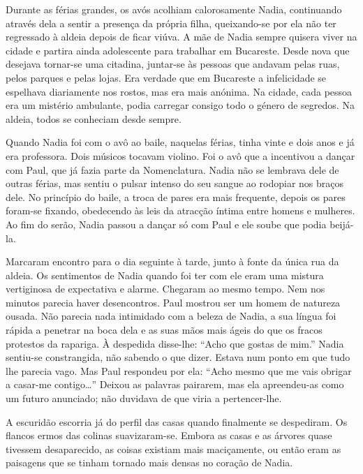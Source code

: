Durante as férias grandes, os avós acolhiam calorosamente Nadia,
continuando através dela a sentir a presença da própria filha,
queixando-se por ela não ter regressado à aldeia depois de ficar viúva.
A mãe de Nadia sempre quisera viver na cidade e partira ainda
adolescente para trabalhar em Bucareste. Desde nova que desejava
tornar-se uma citadina, juntar-se às pessoas que andavam pelas ruas,
pelos parques e pelas lojas. Era verdade que em Bucareste a infelicidade
se espelhava diariamente nos rostos, mas era mais anónima. Na cidade,
cada pessoa era um mistério ambulante, podia carregar consigo todo o
género de segredos. Na aldeia, todos se conheciam desde sempre.

Quando Nadia foi com o avô ao baile, naquelas férias, tinha vinte e dois
anos e já era professora. Dois músicos tocavam violino. Foi o avô que a
incentivou a dançar com Paul, que já fazia parte da Nomenclatura. Nadia
não se
lembrava dele de outras férias, mas sentiu o pulsar intenso do seu
sangue ao rodopiar nos braços dele. No princípio do baile, a troca de
pares era mais frequente, depois os pares foram-se fixando, obedecendo
às leis da atracção íntima entre homens e mulheres. Ao fim do serão,
Nadia passou a dançar só com Paul e ele soube que podia beijá-la.

Marcaram encontro para o dia seguinte à tarde, junto à fonte da única
rua da aldeia. Os sentimentos de Nadia quando foi ter com ele eram uma
mistura vertiginosa de expectativa e alarme. Chegaram ao mesmo tempo.
Nem nos minutos parecia haver desencontros. Paul mostrou ser um homem de
natureza ousada. Não parecia nada intimidado com a beleza de Nadia, a
sua língua foi rápida a penetrar na boca dela e as suas mãos mais ágeis
do que os fracos protestos da rapariga. À despedida disse-lhe: ``Acho que
gostas de mim.'' Nadia sentiu-se constrangida, não sabendo o que dizer.
Estava num ponto em que tudo lhe parecia vago. Mas Paul respondeu por
ela: ``Acho mesmo que me vais obrigar a casar-me contigo\ldots{}'' Deixou
as palavras pairarem, mas ela apreendeu-as como um futuro anunciado; não
duvidava de que viria a pertencer-lhe.

A escuridão escorria já do perfil das casas quando finalmente se despediram. Os flancos ermos das colinas suavizaram-se. Embora
as casas e as árvores quase tivessem desaparecido, as coisas existiam
mais maciçamente, ou então eram as paisagens que se tinham tornado mais
densas no coração de Nadia.

